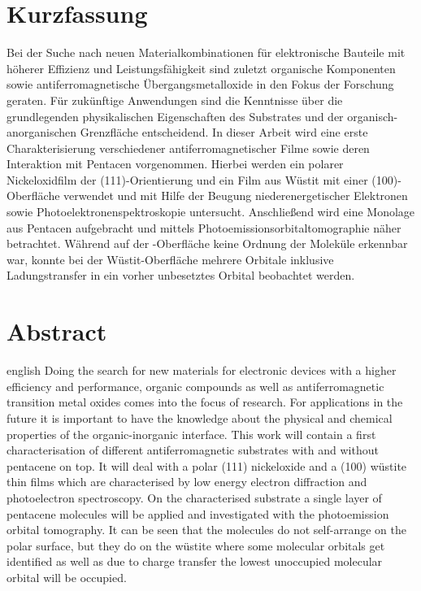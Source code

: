 \thispagestyle{plain}

\section*{Kurzfassung}
Bei der Suche nach neuen Materialkombinationen für elektronische Bauteile mit höherer Effizienz und Leistungsfähigkeit sind zuletzt organische Komponenten sowie antiferromagnetische Übergangsmetalloxide in den Fokus der Forschung geraten.
Für zukünftige Anwendungen sind die Kenntnisse über die grundlegenden physikalischen Eigenschaften des Substrates und der organisch-anorganischen Grenzfläche entscheidend.
In dieser Arbeit wird eine erste Charakterisierung verschiedener antiferromagnetischer Filme sowie deren Interaktion mit Pentacen vorgenommen.
Hierbei werden ein polarer Nickeloxidfilm der (111)-Orientierung und ein Film aus Wüstit mit einer (100)-Oberfläche verwendet und mit Hilfe der Beugung niederenergetischer Elektronen sowie Photoelektronenspektroskopie untersucht.
Anschließend wird eine Monolage aus Pentacen aufgebracht und mittels Photoemissionsorbitaltomographie näher betrachtet.
Während auf der -Oberfläche keine Ordnung der Moleküle erkennbar war, konnte bei der Wüstit-Oberfläche mehrere Orbitale inklusive Ladungstransfer in ein vorher unbesetztes Orbital beobachtet werden.

\section*{Abstract}
\begin{foreignlanguage}{english}
    Doing the search for new materials for electronic devices with a higher efficiency and performance, organic compounds as well as antiferromagnetic transition metal oxides comes into the focus of research.
    For applications in the future it is important to have the knowledge about the physical and chemical properties of the organic-inorganic interface.
    This work will contain a first characterisation of different antiferromagnetic substrates with and without pentacene on top.
    It will deal with a polar (111) nickeloxide and a (100) wüstite thin films which are characterised by low energy electron diffraction and photoelectron spectroscopy.
    On the characterised substrate a single layer of pentacene molecules will be applied and investigated with the photoemission orbital tomography.
    It can be seen that the molecules do not self-arrange on the polar surface, but they do on the wüstite where some molecular orbitals get identified as well as due to charge transfer the lowest unoccupied molecular orbital will be occupied.
\end{foreignlanguage}
